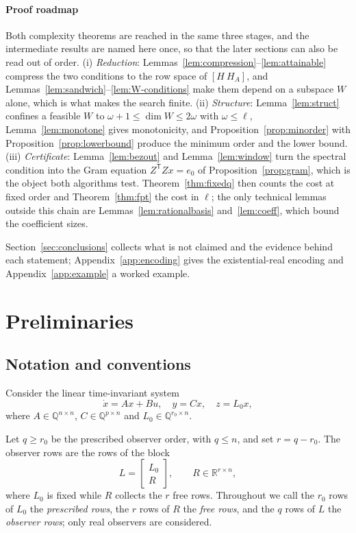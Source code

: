 \documentclass[journal]{IEEEtran}
\theoremstyle{plainn}
\theoremstyle{remark}
\begin{document}
\paragraph*{Proof roadmap}
Both complexity theorems are reached in the same three stages, and the intermediate results are named
here once, so that the later sections can also be read out of order. (i) \emph{Reduction}:
Lemmas~\ref{lem:compression}--\ref{lem:attainable} compress the two conditions to the row space of
$[H\ H_A]$, and Lemmas~\ref{lem:sandwich}--\ref{lem:W-conditions} make them depend on a subspace $W$
alone, which is what makes the search finite. (ii) \emph{Structure}: Lemma~\ref{lem:struct} confines a
feasible $W$ to $\omega+1\le\dim W\le2\omega$ with $\omega\le\ell$, Lemma~\ref{lem:monotone} gives
monotonicity, and Proposition~\ref{prop:minorder} with Proposition~\ref{prop:lowerbound} produce the
minimum order and the lower bound. (iii) \emph{Certificate}: Lemma~\ref{lem:bezout} and
Lemma~\ref{lem:window} turn the spectral condition into the Gram equation $Z^{\mathsf T}Zx=e_0$ of
Proposition~\ref{prop:gram}, which is the object both algorithms test. Theorem~\ref{thm:fixedq} then
counts the cost at fixed order and Theorem~\ref{thm:fpt} the cost in $\ell$; the only technical lemmas
outside this chain are Lemmas~\ref{lem:rationalbasis} and~\ref{lem:coeff}, which bound the coefficient
sizes.

Section~\ref{sec:conclusions} collects what is not claimed and the evidence behind each statement;
Appendix~\ref{app:encoding} gives the existential-real encoding and Appendix~\ref{app:example} a worked
example.

\section{Preliminaries}\label{sec:prelim}

\subsection{Notation and conventions}\label{sec:notation}

Consider the linear time-invariant system
\begin{equation}\label{system}
\dot{x}=Ax+Bu,\quad y=Cx,\quad z=L_0x,
\end{equation}
where $A\in\mathbb Q^{n\times n}$, $C\in\mathbb Q^{p\times n}$ and
$L_0\in\mathbb Q^{r_0\times n}$.

Let $q\ge r_0$ be the prescribed observer order, with $q\le n$, and set $r=q-r_0$. The
observer rows are the rows of the block
\begin{equation*}
L=\begin{bmatrix}L_0\\R\end{bmatrix},\qquad R\in\mathbb R^{r\times n},
\end{equation*}
where $L_0$ is fixed while $R$ collects the $r$ free rows. Throughout we call the $r_0$ rows of
$L_0$ the \emph{prescribed rows}, the $r$ rows of $R$ the \emph{free rows}, and the $q$ rows of $L$
the \emph{observer rows}; only real observers are considered.
\end{document}
